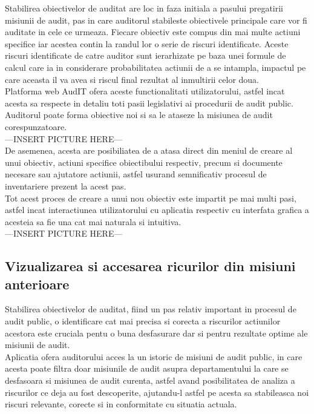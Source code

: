 Stabilirea obiectivelor de auditat are loc in faza initiala a pasului pregatirii misiunii de audit, pas in care auditorul stabileste obiectivele principale care vor fi auditate in cele ce urmeaza. Fiecare obiectiv este compus din mai multe actiuni specifice iar acestea contin la randul lor o serie de riscuri identificate. Aceste riscuri identificate de catre auditor sunt ierarhizate pe baza unei formule de calcul care ia in considerare probabilitatea actiunii de a se intampla, impactul pe care aceasta il va avea si riscul final rezultat al inmultirii celor doua.\\
Platforma web AudIT ofera aceste functionalitati utilizatorului, astfel incat acesta sa respecte in detaliu toti pasii legislativi ai procedurii de audit public. Auditorul poate forma obiective noi si sa le ataseze la misiunea de audit corespunzatoare.\\
---INSERT PICTURE HERE---\\
De asemenea, acesta are posibiliatea de a atasa direct din meniul de creare al unui obiectiv, actiuni specifice obiectibului respectiv, precum si documente necesare sau ajutatore actiunii, astfel usurand semnificativ procesul de inventariere prezent la acest pas.\\
Tot acest proces  de creare a unui nou obiectiv este impartit pe mai multi pasi, astfel incat interactiunea utilizatorului cu aplicatia respectiv cu interfata grafica a acesteia sa fie una cat mai naturala si intuitiva.\\
---INSERT PICTURE HERE---

\subsection{Vizualizarea si accesarea ricurilor din misiuni anterioare}
Stabilirea obiectivelor de auditat, fiind un pas relativ important in procesul de audit public, o identificare cat mai precisa si corecta a riscurilor actiunilor acestora este cruciala pentu o buna desfasurare dar si pentru rezultate optime ale misiunii de audit.\\
Aplicatia ofera auditorului acces la un istoric de misiuni de audit public, in care acesta poate filtra doar misiunile de audit asupra departamentului la care se desfasoara si misiunea de audit curenta, astfel avand posibilitatea de analiza a riscurilor ce deja au fost descoperite, ajutandu-l 
astfel pe acesta sa stabileasca noi riscuri relevante, corecte si in conformitate cu situatia actuala.

